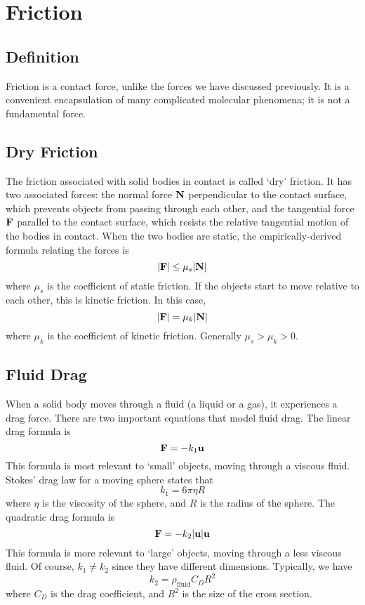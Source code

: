 \documentclass{article}
\begin{document}
\section{Friction}
\subsection{Definition}
Friction is a contact force, unlike the forces we have discussed previously. It is a convenient encapsulation of many complicated molecular phenomena; it is not a fundamental force.

\subsection{Dry Friction}
The friction associated with solid bodies in contact is called `dry' friction. It has two associated forces: the normal force $\vb N$ perpendicular to the contact surface, which prevents objects from passing through each other, and the tangential force $\vb F$ parallel to the contact surface, which resists the relative tangential motion of the bodies in contact. When the two bodies are static, the empirically-derived formula relating the forces is
\[ \abs{\vb F} \leq \mu_s \abs{\vb N} \]
where $\mu_s$ is the coefficient of static friction. If the objects start to move relative to each other, this is kinetic friction. In this case,
\[ \abs{\vb F} = \mu_k \abs{\vb N} \]
where $\mu_k$ is the coefficient of kinetic friction. Generally $\mu_s > \mu_k > 0$.

\subsection{Fluid Drag}
When a solid body moves through a fluid (a liquid or a gas), it experiences a drag force. There are two important equations that model fluid drag. The linear drag formula is
\[ \vb F = -k_1 \vb u \]
This formula is most relevant to `small' objects, moving through a viscous fluid. Stokes' drag law for a moving sphere states that
\[ k_1 = 6 \pi \eta R \]
where $\eta$ is the viscosity of the sphere, and $R$ is the radius of the sphere. The quadratic drag formula is
\[ \vb F = -k_2 \abs{\vb u} \vb u \]
This formula is more relevant to `large' objects, moving through a less viscous fluid. Of course, $k_1 \neq k_2$ since they have different dimensions. Typically, we have
\[ k_2 = \rho_{\text{fluid}} C_D R^2 \]
where $C_D$ is the drag coefficient, and $R^2$ is the size of the cross section.
\end{document}
